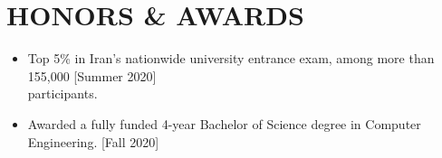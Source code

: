 \documentclass[11pt,letter,sans]{moderncv} %
\begin{document}
        
\section{HONORS \& AWARDS}
    \begin{itemize}
        \item  Top 5\% in Iran's nationwide university entrance exam, among more than 155,000  \hfill[Summer 2020]\\participants.
        \vspace{0.2em}
        \item Awarded a fully funded 4-year Bachelor of Science degree in Computer Engineering. \hfill[Fall 2020]
    \end{itemize}
\end{document}
